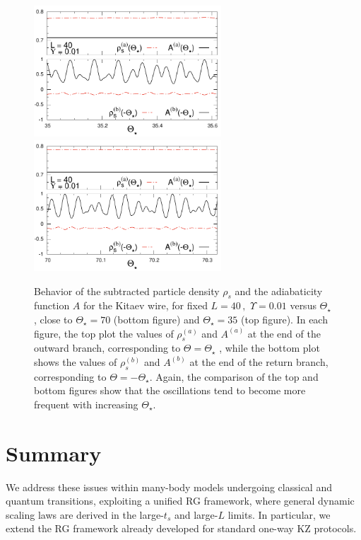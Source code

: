 \begin{figure}[!t]
        \centering
        \includegraphics[width=7cm]{imm/diffThstaru001T35l40.pdf}
	\includegraphics[width=7cm]{imm/diffThstaru001T70l40.pdf}
	\caption{Behavior of the subtracted particle density $\rho_s$
	 and the adiabaticity function $A$ for the Kitaev wire,
	for fixed $L = 40\,,\,\, \Upsilon = 0.01$ versus $\Theta_\star$ , 
	close to $\Theta_\star = 70$
	(bottom figure) and $\Theta_\star = 35$ (top figure). In each figure,
	the top plot the values of $\rho_s^{(a)}$ and $A^{(a)}$ at the end of the
	outward branch, corresponding to $\Theta = \Theta_\star$ , while the bottom
	plot shows the values of $\rho_s^{(b)}$ and $A^{(b)}$ at the end of the return
	branch, corresponding to $\Theta = -\Theta_\star$. Again, the comparison
	of the top and bottom figures show that the oscillations tend
	to become more frequent with increasing $\Theta_\star$. }
	\label{oscill}
\end{figure}


\section{Summary}

We address these issues within many-body models 
undergoing classical and quantum transitions, exploiting a
unified RG framework, where general dynamic scaling
laws are derived in the large-$t_s$ and large-$L$ limits. In particular,
we extend the RG framework already developed for standard one-way KZ protocols.


